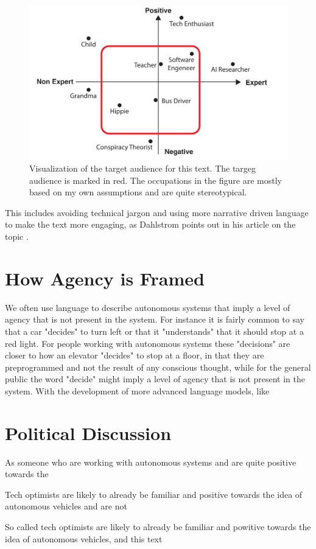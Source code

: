 \documentclass{iopconfser}
\begin{document}
\begin{figure}[H]
    \centering
    \includegraphics[width=.6\textwidth]{figures/overview.pdf}
    \caption{Visualization of the target audience for this text. The targeg audience is marked in red. The occupations in the figure are mostly based on my own assumptions and are quite stereotypical.}
\end{figure}


This includes avoiding technical jargon and using more narrative driven language to make the text more engaging, as Dahlstrom points out in his article on the topic \cite{dahlstromUsingNarrativesStorytelling2014}.

\section*{How Agency is Framed}
We often use language to describe autonomous systems that imply a level of agency that is not present in the system.
For instance it is fairly common to say that a car "decides" to turn left or that it "understands" that it should stop at a red light.
For people working with autonomous systems these "decisions" are closer to how an elevator "decides" to stop at a floor, in that they are preprogrammed and not the result of any conscious thought, while for the general public the word "decide" might imply a level of agency that is not present in the system.
With the development of more advanced language models, like 


\section*{Political Discussion}











As someone who are working with autonomous systems and are quite positive towards the 






Tech optimists are likely to already be familiar and positive towards the idea of autonomous vehicles and are not 

So called tech optimists are likely to already be familiar and powitive towards the idea of autonomous vehicles, and this text 


\pagebreak
\printbibliography
\end{document}
